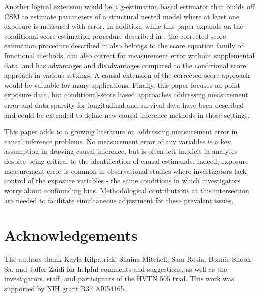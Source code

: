 \documentclass[useAMS,usenatbib,referee]{biom}
\begin{document}
Another logical extension would be a g-estimation based estimator that builds off CSM to estimate parameters of a structural nested model where at least one exposure is measured with error. In addition, while this paper expands on the conditional score estimation procedure described in \citet{stefanski1987}, the corrected score estimation procedure described in \citet{nakamura1990} also belongs to the score equation family of functional methods, can also correct for measurement error without supplemental data, and has advantages and disadvantages compared to the conditional score approach in various settings. A causal extension of the corrected-score approach would be valuable for many applications. Finally, this paper focuses on point-exposure data, but conditional-score based approaches addressing measurement error and data sparsity for longitudinal and survival data have been described and could be extended to define new causal inference methods in those settings.

This paper adds to a growing literature on addressing measurement error in causal inference problems. No measurement error of any variables is a key assumption in drawing causal inference, but is often left implicit in analyses despite being critical to the identification of causal estimands. Indeed, exposure measurement error is common in observational studies where investigators lack control of the exposure variables - the same conditions in which investigators worry about confounding bias. Methodological contributions at this intersection are needed to facilitate simultaneous adjustment for these prevalent issues.





\backmatter


\section*{Acknowledgements}

The authors thank Kayla Kilpatrick, Shaina Mitchell, Sam Rosin, Bonnie Shook-Sa, and Jaffer Zaidi for helpful comments and suggestions, as well as the investigators, staff, and participants of the HVTN 505 trial. This work was supported by NIH grant R37 AI054165. \vspace*{-8pt}
\end{document}
